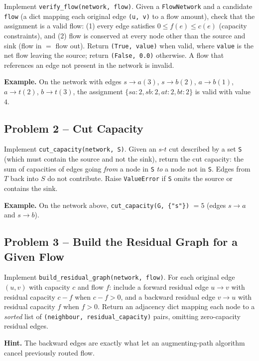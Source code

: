 \documentclass[11pt]{article}
\begin{document}
Implement \texttt{verify\_flow(network, flow)}. Given a \texttt{FlowNetwork} and a
candidate \texttt{flow} (a dict mapping each original edge \texttt{(u, v)} to a flow
amount), check that the assignment is a valid flow: (1) every edge satisfies $0 \le f(e)
\le c(e)$ (capacity constraints), and (2) flow is conserved at every node other than the
source and sink (flow in $=$ flow out). Return \texttt{(True, value)} when valid, where
\texttt{value} is the net flow leaving the source; return \texttt{(False, 0.0)} otherwise.
A flow that references an edge not present in the network is invalid.

\textbf{Example.} On the network with edges $s\!\to\!a(3)$, $s\!\to\!b(2)$, $a\!\to\!b(1)$,
$a\!\to\!t(2)$, $b\!\to\!t(3)$, the assignment $\{sa{:}2, sb{:}2, at{:}2, bt{:}2\}$ is
valid with value $4$.

\subsection*{Problem 2 -- Cut Capacity}

Implement \texttt{cut\_capacity(network, S)}. Given an $s$-$t$ cut described by a set
\texttt{S} (which must contain the source and not the sink), return the cut capacity: the
sum of capacities of edges going \emph{from} a node in \texttt{S} \emph{to} a node not in
\texttt{S}. Edges from $T$ back into $S$ do not contribute. Raise \texttt{ValueError} if
\texttt{S} omits the source or contains the sink.

\textbf{Example.} On the network above, \texttt{cut\_capacity(G, \{"s"\})} $= 5$ (edges
$s\!\to\!a$ and $s\!\to\!b$).

\subsection*{Problem 3 -- Build the Residual Graph for a Given Flow}

Implement \texttt{build\_residual\_graph(network, flow)}. For each original edge $(u,v)$
with capacity $c$ and flow $f$: include a forward residual edge $u\!\to\!v$ with residual
capacity $c-f$ when $c-f>0$, and a backward residual edge $v\!\to\!u$ with residual
capacity $f$ when $f>0$. Return an adjacency dict mapping each node to a \emph{sorted} list
of \texttt{(neighbour, residual\_capacity)} pairs, omitting zero-capacity residual edges.

\textbf{Hint.} The backward edges are exactly what let an augmenting-path algorithm cancel
previously routed flow.
\end{document}
